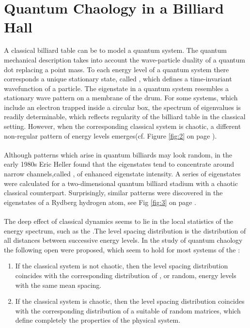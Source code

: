 \section*{Quantum Chaology in a Billiard Hall}
A classical billiard table can be  to model a quantum system. The quantum mechanical description takes into account the wave-particle duality of a quantum dot replacing a point mass. To each energy level of a quantum system there corresponds a unique stationary state, called , which defines a time-invariant wavefunction of a particle. \cite{port} The eigenstate in a quantum system resembles a stationary wave pattern on a membrane of the drum. For some systems, which include an electron trapped inside a circular box, the spectrum of eigenvalues is readily determinable, which reflects regularity of the billiard table in the classical setting. However, when the corresponding classical system is chaotic, a different non-regular pattern of energy levels emerges(cf. Figure \ref{fig:2} on page \pageref{fig:2}).
\\\\Although patterns which arise in quantum billiards may look random, in the early 1980s Eric Heller found that the eigenstates tend to concentrate around narrow channels,called , of enhanced eigenstate intensity. \cite{gutz, hellb} A series of eigenstates were calculated for a two-dimensional quantum billiard stadium with a chaotic classical counterpart. Surprisingly, similar patterns were discovered in the eigenstates of a Rydberg hydrogen atom, see Fig \ref{fig:3} on page \pageref{fig:3}.\\\\
The deep effect of classical dynamics seems to lie in the local statistics of the energy spectrum, such as the .\cite{zeev}The level spacing distribution is the distribution of all distances between successive energy levels. In the study of quantum chaology the following open  were proposed, which seem to hold for most systems of the \cite{pr}:
\begin{enumerate}
\item If the classical system is not chaotic, then the level spacing distribution coincides with the corresponding distribution of , or random, energy levels with the same mean spacing.\cite{tabor}
\item If the classical system is chaotic, then the level spacing distribution coincides with the corresponding distribution of a suitable  of random matrices, which define completely the properties of the physical system. \cite{BGS}
\end{enumerate}
